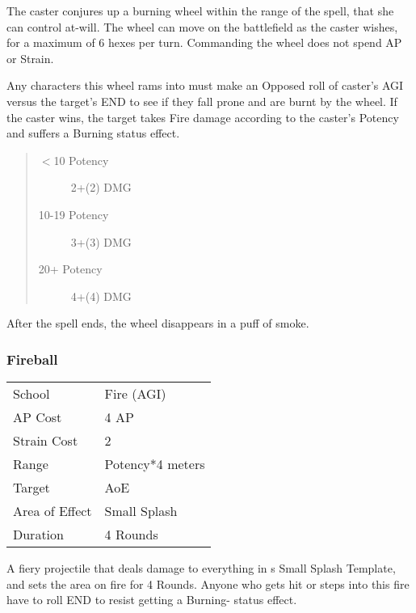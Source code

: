 \documentclass[11pt,a4paper,twocolumn]{book}
\begin{document}
\medskip

The caster conjures up a burning wheel within the range of the spell, that she can control at-will. The wheel can move on the battlefield as the caster wishes, for a maximum of 6 hexes per turn. Commanding the wheel does not spend AP or Strain. 

Any characters this wheel rams into must make an Opposed roll of caster's AGI versus the target's END to see if they fall prone and are burnt by the wheel. If the caster wins, the target takes Fire damage according to the caster's Potency and suffers a Burning status effect.

\begin{quote}
	\begin{description}
		\item[$<$10 Potency] 	2+(2) DMG
		\item[10-19 Potency] 	3+(3) DMG
		\item[20+ Potency]  	4+(4) DMG
	\end{description}	
\end{quote}

After the spell ends, the wheel disappears in a puff of smoke.

\subsubsection*{Fireball}
{
	\begin{tabu} to 70mm{| X[l,4] | X[l,7] |}
		\hline
		School         & Fire (AGI)       \\
		AP Cost        & 4 AP             \\
		Strain Cost    & 2                \\
		Range          & Potency*4 meters \\
		Target         & AoE              \\
		Area of Effect & Small Splash     \\
		Duration       & 4 Rounds         \\ \hline
	\end{tabu}
	
}

\medskip

A fiery projectile that deals damage to everything in s Small Splash Template, and sets the area on fire for 4 Rounds. Anyone who gets hit or steps into this fire have to roll END to resist getting a Burning- status effect.
\end{document}
